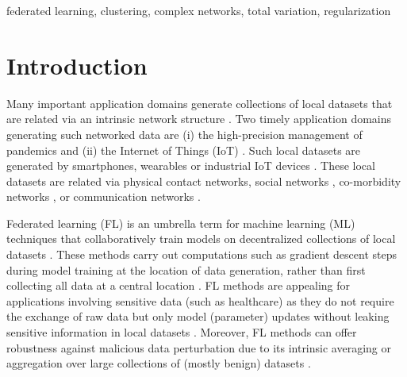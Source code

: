 \documentclass[lettersize,journal]{IEEEtran}
\begin{document}
\begin{IEEEkeywords}
	federated learning, clustering, complex networks, total variation, regularization
\end{IEEEkeywords}

%


\section{Introduction}
\label{sec:intro}

Many important application domains generate collections of local datasets that are related via 
an intrinsic network structure \cite{BigDataNetworksBook}. Two timely application domains 
generating such networked data are (i) the high-precision management of pandemics and (ii) the Internet of Things (IoT) \cite{Wollschlaeger2017}.
Such local datasets are generated by smartphones, wearables or industrial IoT devices \cite{Ates:2021ug}.
These local datasets are related via physical contact networks, social networks \cite{NewmannBook}, 
co-morbidity networks \cite{NetMedNat2010}, or communication networks \cite{Grantz:2020wn}. 

Federated learning (FL) is an umbrella term for machine learning (ML) techniques that collaboratively 
train models on decentralized collections of local datasets \cite{pmlr-v54-mcmahan17a,Cheng2020,Smith2017}. 
These methods carry out computations such as gradient descent steps during model training at the location 
of data generation, rather than first collecting all data at a central location \cite{ShipCompute}. 
FL methods are appealing for applications involving sensitive data (such as healthcare) as they 
do not require the exchange of raw data but only model (parameter) updates without leaking sensitive information in local datasets \cite{Cheng2020}. 
Moreover, FL methods can offer robustness 
against malicious data perturbation due to its intrinsic averaging or aggregation over large collections 
of (mostly benign) datasets \cite{Sattler2020}.
\end{document}
